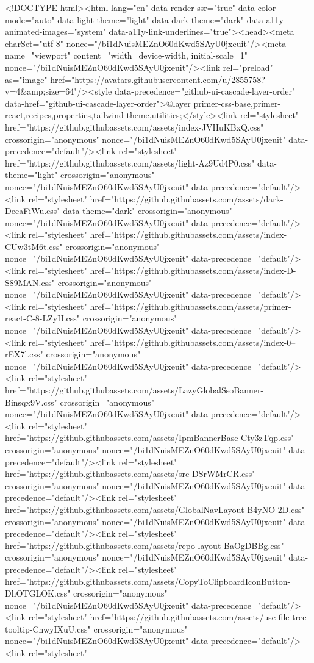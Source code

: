 <!DOCTYPE html><html lang="en" data-render-ssr="true" data-color-mode="auto" data-light-theme="light" data-dark-theme="dark" data-a11y-animated-images="system" data-a11y-link-underlines="true"><head><meta charSet="utf-8" nonce="/bi1dNuisMEZnO60dKwd5SAyU0jxeuit"/><meta name="viewport" content="width=device-width, initial-scale=1" nonce="/bi1dNuisMEZnO60dKwd5SAyU0jxeuit"/><link rel="preload" as="image" href="https://avatars.githubusercontent.com/u/2855758?v=4&amp;size=64"/><style data-precedence="github-ui-cascade-layer-order" data-href="github-ui-cascade-layer-order">@layer primer-css-base,primer-react,recipes,properties,tailwind-theme,utilities;</style><link rel="stylesheet" href="https://github.githubassets.com/assets/index-JVHuKBxQ.css" crossorigin="anonymous" nonce="/bi1dNuisMEZnO60dKwd5SAyU0jxeuit" data-precedence="default"/><link rel="stylesheet" href="https://github.githubassets.com/assets/light-Az9Ud4P0.css" data-theme="light" crossorigin="anonymous" nonce="/bi1dNuisMEZnO60dKwd5SAyU0jxeuit" data-precedence="default"/><link rel="stylesheet" href="https://github.githubassets.com/assets/dark-DeeaFiWu.css" data-theme="dark" crossorigin="anonymous" nonce="/bi1dNuisMEZnO60dKwd5SAyU0jxeuit" data-precedence="default"/><link rel="stylesheet" href="https://github.githubassets.com/assets/index-CUw3tM6t.css" crossorigin="anonymous" nonce="/bi1dNuisMEZnO60dKwd5SAyU0jxeuit" data-precedence="default"/><link rel="stylesheet" href="https://github.githubassets.com/assets/index-D-S89MAN.css" crossorigin="anonymous" nonce="/bi1dNuisMEZnO60dKwd5SAyU0jxeuit" data-precedence="default"/><link rel="stylesheet" href="https://github.githubassets.com/assets/primer-react-C-8-LZyH.css" crossorigin="anonymous" nonce="/bi1dNuisMEZnO60dKwd5SAyU0jxeuit" data-precedence="default"/><link rel="stylesheet" href="https://github.githubassets.com/assets/index-0--rEX7l.css" crossorigin="anonymous" nonce="/bi1dNuisMEZnO60dKwd5SAyU0jxeuit" data-precedence="default"/><link rel="stylesheet" href="https://github.githubassets.com/assets/LazyGlobalSsoBanner-Binsqx9V.css" crossorigin="anonymous" nonce="/bi1dNuisMEZnO60dKwd5SAyU0jxeuit" data-precedence="default"/><link rel="stylesheet" href="https://github.githubassets.com/assets/IpmBannerBase-Cty3zTqp.css" crossorigin="anonymous" nonce="/bi1dNuisMEZnO60dKwd5SAyU0jxeuit" data-precedence="default"/><link rel="stylesheet" href="https://github.githubassets.com/assets/src-DSrWMrCR.css" crossorigin="anonymous" nonce="/bi1dNuisMEZnO60dKwd5SAyU0jxeuit" data-precedence="default"/><link rel="stylesheet" href="https://github.githubassets.com/assets/GlobalNavLayout-B4yNO-2D.css" crossorigin="anonymous" nonce="/bi1dNuisMEZnO60dKwd5SAyU0jxeuit" data-precedence="default"/><link rel="stylesheet" href="https://github.githubassets.com/assets/repo-layout-BaOgDBBg.css" crossorigin="anonymous" nonce="/bi1dNuisMEZnO60dKwd5SAyU0jxeuit" data-precedence="default"/><link rel="stylesheet" href="https://github.githubassets.com/assets/CopyToClipboardIconButton-DhOTGLOK.css" crossorigin="anonymous" nonce="/bi1dNuisMEZnO60dKwd5SAyU0jxeuit" data-precedence="default"/><link rel="stylesheet" href="https://github.githubassets.com/assets/use-file-tree-tooltip-CnwyIXuU.css" crossorigin="anonymous" nonce="/bi1dNuisMEZnO60dKwd5SAyU0jxeuit" data-precedence="default"/><link rel="stylesheet" 